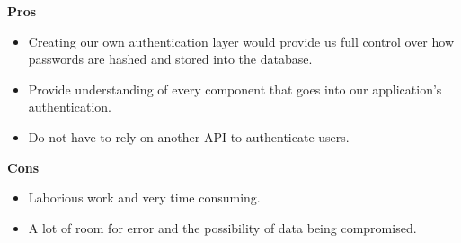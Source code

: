 \textbf{Pros}
\begin{itemize}
    \item Creating our own authentication layer would provide us full control over how passwords are hashed and stored into the database. 
    \item Provide understanding of every component that goes into our application's authentication.
    \item Do not have to rely on another API to authenticate users.
\end{itemize}
\textbf{Cons}
\begin{itemize}
    \item Laborious work and very time consuming.
    \item A lot of room for error and the possibility of data being compromised.
\end{itemize}
